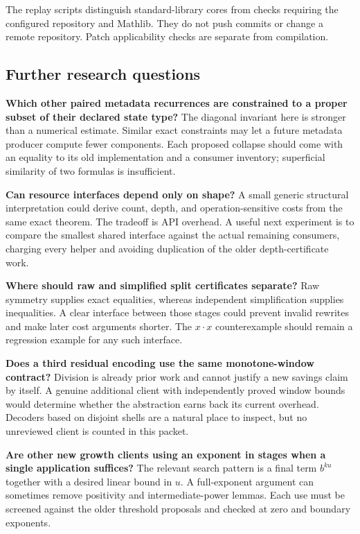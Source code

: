 \documentclass[11pt,letterpaper]{article}
\begin{document}
The replay scripts distinguish standard-library cores from checks requiring the configured repository and Mathlib. They do not push commits or change a remote repository. Patch applicability checks are separate from compilation.

\subsection{Further research questions}

\textbf{Which other paired metadata recurrences are constrained to a proper subset of their declared state type?} The diagonal invariant here is stronger than a numerical estimate. Similar exact constraints may let a future metadata producer compute fewer components. Each proposed collapse should come with an equality to its old implementation and a consumer inventory; superficial similarity of two formulas is insufficient.

\textbf{Can resource interfaces depend only on shape?} A small generic structural interpretation could derive count, depth, and operation-sensitive costs from the same exact theorem. The tradeoff is API overhead. A useful next experiment is to compare the smallest shared interface against the actual remaining consumers, charging every helper and avoiding duplication of the older depth-certificate work.

\textbf{Where should raw and simplified split certificates separate?} Raw symmetry supplies exact equalities, whereas independent simplification supplies inequalities. A clear interface between those stages could prevent invalid rewrites and make later cost arguments shorter. The $x\cdot x$ counterexample should remain a regression example for any such interface.

\textbf{Does a third residual encoding use the same monotone-window contract?} Division is already prior work and cannot justify a new savings claim by itself. A genuine additional client with independently proved window bounds would determine whether the abstraction earns back its current overhead. Decoders based on disjoint shells are a natural place to inspect, but no unreviewed client is counted in this packet.

\textbf{Are other new growth clients using an exponent in stages when a single application suffices?} The relevant search pattern is a final term $b^{ku}$ together with a desired linear bound in $u$. A full-exponent argument can sometimes remove positivity and intermediate-power lemmas. Each use must be screened against the older threshold proposals and checked at zero and boundary exponents.
\end{document}
